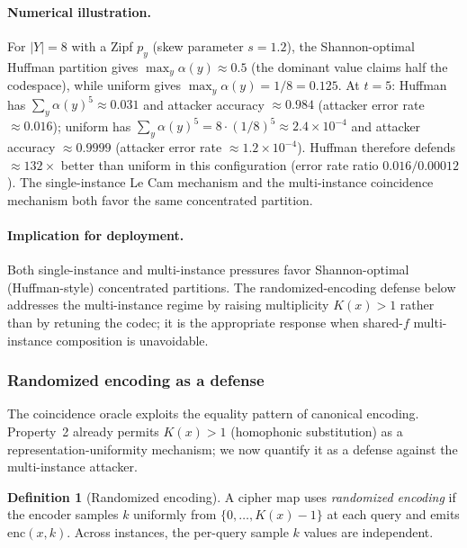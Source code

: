 \documentclass[11pt]{article}
\theoremstyle{definition}
\newtheorem{definition}{Definition}[section]
\theoremstyle{plain}
\theoremstyle{remark}
\newcommand{\enc}{\mathrm{enc}}
\begin{document}
\paragraph{Numerical illustration.}
For $|Y| = 8$ with a Zipf $p_y$ (skew parameter $s = 1.2$), the
Shannon-optimal Huffman partition gives $\max_y \alpha(y) \approx
0.5$ (the dominant value claims half the codespace), while uniform
gives $\max_y \alpha(y) = 1/8 = 0.125$.  At $t = 5$: Huffman has
$\sum_y \alpha(y)^5 \approx 0.031$ and attacker accuracy $\approx
0.984$ (attacker error rate $\approx 0.016$); uniform has $\sum_y
\alpha(y)^5 = 8 \cdot (1/8)^5 \approx 2.4 \times 10^{-4}$ and
attacker accuracy $\approx 0.9999$ (attacker error rate
$\approx 1.2 \times 10^{-4}$).  Huffman therefore defends
$\approx 132 \times$ better than uniform in this configuration
(error rate ratio $0.016 / 0.00012$).  The single-instance Le Cam
mechanism and the multi-instance coincidence mechanism both favor
the same concentrated partition.

\paragraph{Implication for deployment.}
Both single-instance and multi-instance pressures favor Shannon-optimal
(Huffman-style) concentrated partitions.  The randomized-encoding
defense below addresses the multi-instance regime by raising
multiplicity $K(x) > 1$ rather than by retuning the codec; it is the
appropriate response when shared-$f$ multi-instance composition is
unavoidable.

\subsubsection*{Randomized encoding as a defense}

The coincidence oracle exploits the equality pattern of canonical
encoding.  Property~2 already permits $K(x) > 1$ (homophonic
substitution) as a representation-uniformity mechanism; we now
quantify it as a defense against the multi-instance attacker.

\begin{definition}[Randomized encoding]
\label{def:rand-encoding}
A cipher map uses \emph{randomized encoding} if the encoder samples
$k$ uniformly from $\{0, \ldots, K(x) - 1\}$ at each query and emits
$\enc(x, k)$.  Across instances, the per-query sample $k$ values are
independent.
\end{definition}
\end{document}
